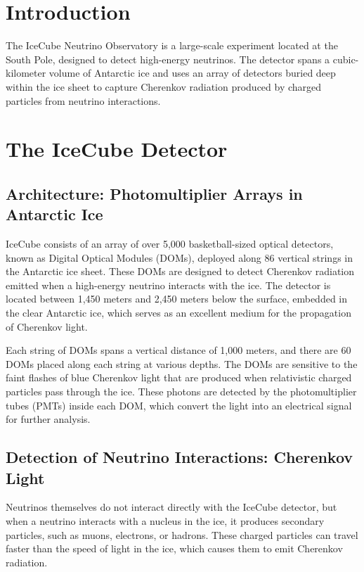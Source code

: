 \documentclass[a4paper,12pt,numbered]{article}
\begin{document}
\citep{Pauli_Letter}

\section{Introduction}
The IceCube Neutrino Observatory is a large-scale experiment located at the South Pole, designed to detect high-energy neutrinos. The detector spans a cubic-kilometer volume of Antarctic ice and uses an array of detectors buried deep within the ice sheet to capture Cherenkov radiation produced by charged particles from neutrino interactions.

\section{The IceCube Detector}

\subsection{Architecture: Photomultiplier Arrays in Antarctic Ice}
IceCube consists of an array of over 5,000 basketball-sized optical detectors, known as Digital Optical Modules (DOMs), deployed along 86 vertical strings in the Antarctic ice sheet. These DOMs are designed to detect Cherenkov radiation emitted when a high-energy neutrino interacts with the ice. The detector is located between 1,450 meters and 2,450 meters below the surface, embedded in the clear Antarctic ice, which serves as an excellent medium for the propagation of Cherenkov light.

Each string of DOMs spans a vertical distance of 1,000 meters, and there are 60 DOMs placed along each string at various depths. The DOMs are sensitive to the faint flashes of blue Cherenkov light that are produced when relativistic charged particles pass through the ice. These photons are detected by the photomultiplier tubes (PMTs) inside each DOM, which convert the light into an electrical signal for further analysis.

\subsection{Detection of Neutrino Interactions: Cherenkov Light}
Neutrinos themselves do not interact directly with the IceCube detector, but when a neutrino interacts with a nucleus in the ice, it produces secondary particles, such as muons, electrons, or hadrons. These charged particles can travel faster than the speed of light in the ice, which causes them to emit Cherenkov radiation.
\end{document}
